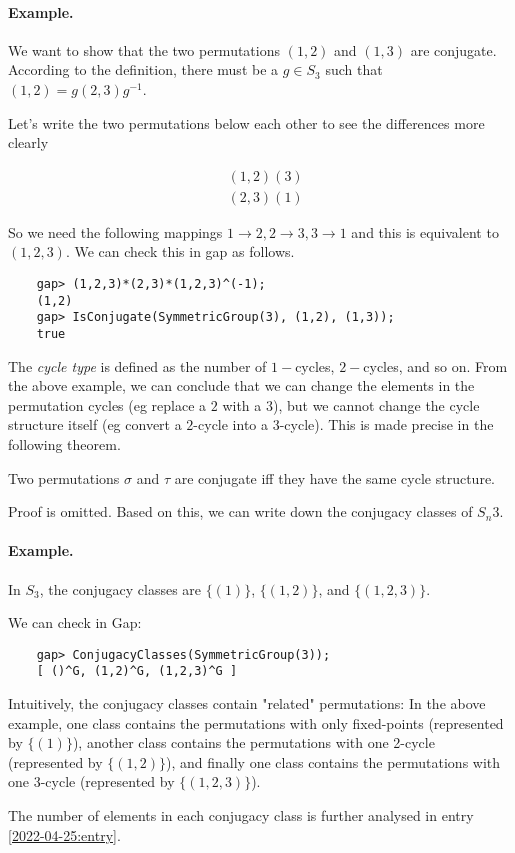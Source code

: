 \paragraph{Example.} We want to show that the two permutations $(1,2)$ and $(1,3)$ are conjugate. According to the definition, there must be a $g \in S_3$ such that $(1,2) = g(2,3)g^{-1}$. 

Let's write the two permutations below each other to see the differences more clearly

\begin{align*}
&(1,2)(3) \\
&(2,3)(1)
\end{align*}

So we need the following mappings $1 \rightarrow 2, 2 \rightarrow 3, 3 \rightarrow 1$ and this is equivalent to $(1,2,3)$. We can check this in gap as follows.

\begin{verbatim}
    gap> (1,2,3)*(2,3)*(1,2,3)^(-1);
    (1,2)
    gap> IsConjugate(SymmetricGroup(3), (1,2), (1,3));
    true
\end{verbatim}

The \emph{cycle type} is defined as the number of $1-$cycles, $2-$cycles, and so on. From the above example, we can conclude that we can change the elements in the permutation cycles (eg replace a $2$ with a $3$), but we cannot change the cycle structure itself (eg convert a $2$-cycle into a $3$-cycle). This is made precise in the following theorem.

\begin{theorem}
Two permutations $\sigma$ and $\tau$ are conjugate iff they have the same cycle structure.
\end{theorem}

Proof is omitted. Based on this, we can write down the conjugacy classes of $S_n3$.

\paragraph{Example.} In $S_3$, the conjugacy classes are $\{(1)\}$, $\{(1,2)\}$, and $\{(1,2,3)\}$.

We can check in Gap:

\begin{verbatim}
    gap> ConjugacyClasses(SymmetricGroup(3));
    [ ()^G, (1,2)^G, (1,2,3)^G ]
\end{verbatim}

Intuitively, the conjugacy classes contain "related" permutations: In the above example, one class contains the permutations with only fixed-points (represented by $\{(1)\}$), another class contains the permutations with one 2-cycle (represented by $\{(1,2)\}$), and finally one class contains the permutations with one 3-cycle (represented by $\{(1,2,3)\}$).

The number of elements in each conjugacy class is further analysed in entry \ref{2022-04-25:entry}.

